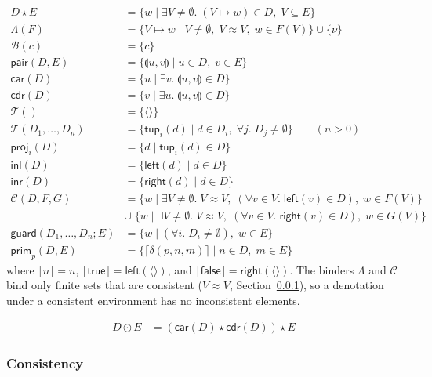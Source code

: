 \documentclass[10pt]{article}
\theoremstyle{acmplain}
\newcommand{\key}[1]{\mathsf{#1}}
\newcommand{\pairv}[2]{\llparenthesis #1, #2 \rrparenthesis}
\newcommand{\tup}[2]{\key{tup}_{#1}(#2)}
\newcommand{\Left}[1]{\key{left}(#1)}
\newcommand{\Right}[1]{\key{right}(#1)}
\newcommand{\emptytup}{\langle\rangle}
\newcommand{\res}[1]{\lceil #1 \rceil}
\newcommand{\app}{\star}
\newcommand{\NE}{\neq\emptyset}
\begin{document}
\begin{align*}
  D \app E &= \{ w \mid \exists V \NE.\; (V \mapsto w) \in D,\; V \subseteq E \} \\
  \Lambda(F) &= \{ V \mapsto w \mid V \NE,\; V \approx V,\; w \in F(V) \} \cup \{ \nu \} \\
  \mathcal{B}(c) &= \{ c \} \\
  \key{pair}(D, E) &= \{ \pairv{u}{v} \mid u \in D,\; v \in E \} \\
  \key{car}(D) &= \{ u \mid \exists v.\; \pairv{u}{v} \in D \} \\
  \key{cdr}(D) &= \{ v \mid \exists u.\; \pairv{u}{v} \in D \} \\
  \mathcal{T}() &= \{ \emptytup \} \\
  \mathcal{T}(D_1,\ldots,D_n) &= \{ \tup{i}{d} \mid d \in D_i,\; \forall j.\; D_j \NE \}
     \qquad (n > 0) \\
  \key{proj}_i(D) &= \{ d \mid \tup{i}{d} \in D \} \\
  \key{inl}(D) &= \{ \Left{d} \mid d \in D \} \\
  \key{inr}(D) &= \{ \Right{d} \mid d \in D \} \\
  \mathcal{C}(D, F, G) &=
    \{ w \mid \exists V \NE.\; V \approx V,\; (\forall v \in V.\; \Left{v} \in D),\; w \in F(V) \} \\
    &\cup\; \{ w \mid \exists V \NE.\; V \approx V,\; (\forall v \in V.\; \Right{v} \in D),\; w \in G(V) \} \\
  \key{guard}(D_1,\ldots,D_n; E) &= \{ w \mid (\forall i.\; D_i \NE),\; w \in E \} \\
  \key{prim}_p(D, E) &= \{ \res{\delta(p, n, m)} \mid n \in D,\; m \in E \}
\end{align*}
where $\res{n} = n$, $\res{\mathsf{true}} = \Left{\emptytup}$, and $\res{\mathsf{false}} = \Right{\emptytup}$.
The binders $\Lambda$ and $\mathcal{C}$ bind only finite sets that are
consistent ($V \approx V$, Section~\ref{sec:consistency}), so a denotation
under a consistent environment has no inconsistent elements.

\begin{align*}
  D \odot E &= (\key{car}(D) \app \key{cdr}(D)) \app E
\end{align*}

\subsubsection{Consistency}\label{sec:consistency}
\end{document}
